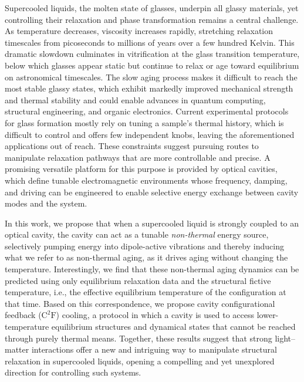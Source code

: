 \documentclass[aps, prl,
 reprint,
 superscriptaddress,
 citeautoscript,  %
 amsmath,amssymb,
 tightenlines
]{revtex4-2}
\begin{document}
Supercooled liquids, the molten state of glasses, underpin all glassy materials, yet controlling their relaxation and phase transformation remains a central challenge.
As temperature decreases, viscosity increases rapidly, stretching relaxation timescales from picoseconds to millions of years over a few hundred Kelvin.\cite{angell2000relaxation}
This dramatic slowdown culminates in vitrification at the glass transition temperature, below which glasses appear static but continue to relax or age toward equilibrium on astronomical timescales.\cite{berthier2011theoretical,biroli2013perspective,chen2023geological}
The slow aging process makes it difficult to reach the most stable glassy states, which exhibit markedly improved mechanical strength and thermal stability and could enable advances in quantum computing, structural engineering, and organic electronics.\cite{rodriguez2022ultrastable}
Current experimental protocols for glass formation mostly rely on tuning a sample’s thermal history, which is difficult to control and offers few independent knobs, leaving the aforementioned applications out of reach.\cite{ediger2017perspective,rodriguez2022ultrastable,ninarello2017models,scalliet2022thirty,jung2025numericalinvestigationequilibriumkauzmann}
These constraints suggest pursuing routes to manipulate relaxation pathways that are more controllable and precise.
A promising versatile platform for this purpose is provided by optical cavities, which define tunable electromagnetic environments whose frequency, damping, and driving can be engineered to enable selective energy exchange between cavity modes and the system.



In this work, we propose that when a supercooled liquid is strongly coupled to an optical cavity,\cite{cohen2024atom,cohen2024photons} the cavity can act as a tunable \emph{non-thermal} energy source, selectively pumping energy into dipole-active vibrations and thereby inducing what we refer to as non-thermal aging, as it drives aging without changing the temperature. Interestingly, we find that these non-thermal aging dynamics can be predicted using only equilibrium relaxation data and the structural fictive temperature, i.e., the effective equilibrium temperature of the configuration at that time. Based on this correspondence, we propose cavity configurational feedback ($\mathrm{C^2F}$) cooling, a protocol in which a cavity is used to access lower-temperature equilibrium structures and dynamical states that cannot be reached through purely thermal means. Together, these results suggest that strong light–matter interactions offer a new and intriguing way to manipulate structural relaxation in supercooled liquids, opening a compelling and yet unexplored direction for controlling such systems.
\end{document}

